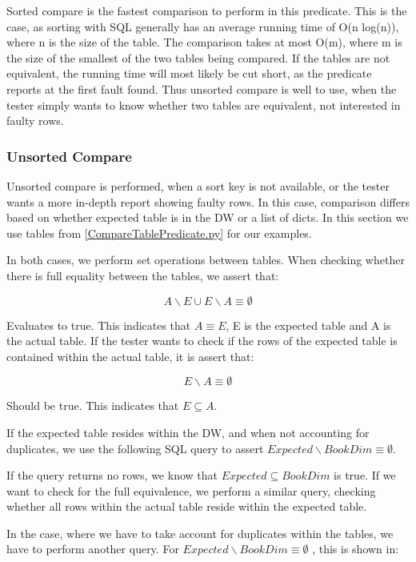 Sorted compare is the  fastest comparison to perform in this predicate. This is the case, as sorting with SQL generally has an average running time of O(n log(n)), where n is the size of the table. The comparison takes at most O(m), where m is the size of the smallest of the two tables being compared. If the tables are not equivalent, the running time will most likely be cut short, as the predicate reports at the first fault found. Thus unsorted compare is well to use, when the tester simply wants to know whether two tables are equivalent, not interested in faulty rows.



\subsubsection{Unsorted Compare}
Unsorted compare is performed, when a sort key is not available, or the tester wants a more in-depth report showing faulty rows. In this case, comparison differs based on whether expected table is in the DW or a list of dicts. In this section we use tables from \cref{CompareTablePredicate.py} for our examples.

In both cases, we perform set operations between tables. When checking whether there is full equality between the tables, we assert that:

\[ A \backslash E \cup E \backslash A \equiv \emptyset \]

Evaluates to true. This indicates that  $A \equiv E$, E is the expected table and A is the actual table. If the tester wants to check if the rows of the expected table is contained within the actual table, it is assert that:
 
\[ E \backslash A \equiv \emptyset \]

Should be true. This indicates that $E \subseteq A$. 

If the expected table resides within the DW, and when not accounting for duplicates, we use the following SQL query to assert $Expected \backslash BookDim \equiv \emptyset $.


If the query returns no rows, we know that $Expected \subseteq BookDim$ is true. If we want to check for the full equivalence, we perform a similar query, checking whether all rows within the actual table reside within  the expected table.

In the case, where we have to take account for duplicates within the tables, we have to perform another query. For $Expected \backslash BookDim \equiv \emptyset$ , this is shown in:


